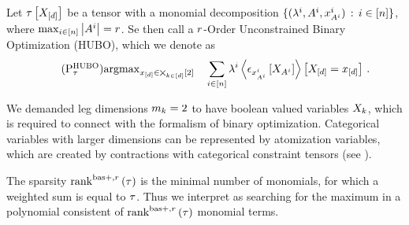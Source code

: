\begin{definition}
    Let $\tau\left[X_{[d]}\right]$ be a tensor with a monomial decomposition $\{(\lambda^{i}, A^{i}, x_{A^{i}}^{i}) \,:\, i\in[n]\}$, where $\max_{i\in[n]}\left|A^{i}\right|=r$.
    Se then call  a $r$-Order Unconstrained Binary Optimization (HUBO), which we denote as
    \begin{align}
        \label{prob:HUBO}\tag{$\probtagtypeinst{\hubosymbol}{\hypercore}$}
        \argmax_{\shortcatindices\in\atomstates} \quad
        \sum_{\decindexin} \slicescalar^{\decindex} \contractionof{\onehotmapofat{\catindexof{\variablesetof{\decindex}}^{\decindex}}{\catvariableof{\variablesetof{\decindex}}}}{\indexedshortcatvariables} \, .
    \end{align}
\end{definition}

\begin{remark}
    We demanded leg dimensions $m_{k}=2$ to have boolean valued variables $X_{k}$, which is required to connect with the formalism of binary optimization.
    Categorical variables with larger dimensions can be represented by atomization variables, which are created by contractions with categorical constraint tensors (see ).
\end{remark}

The sparsity $\mathrm{rank}^{\mathrm{bas+},r}\left(\tau\right)$ is the minimal number of monomials, for which a weighted sum is equal to $\tau$.
Thus we interpret  as searching for the maximum in a polynomial consistent of $\mathrm{rank}^{\mathrm{bas+},r}\left(\tau\right)$ monomial terms.

